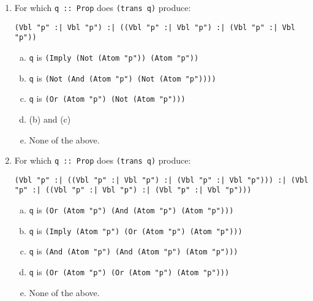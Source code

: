 \documentclass[12pt]{article}
\begin{document}
\begin{enumerate}
\begin{minipage}[t]{2.7in}
{\footnotesize
\begin{verbatim}
data Prop = Atom String
          | Not Prop
          | Imply Prop Prop
          | Or Prop Prop
          | And Prop Prop
          | Iff Prop Prop
          deriving Show

data NAND = Vbl String 
          | NAND :| NAND 
             deriving Show
\end{verbatim}
}
\end{minipage}
\begin{minipage}[t]{2in}
{\footnotesize
\begin{verbatim}
trans :: Prop -> NAND
trans (Atom v)      = Vbl v
trans (Not p)       = trans p :| trans p
trans (Or p1 p2)    = (p1' :| p1') :| (p2' :| p2')
  where p1' = trans p1
        p2' = trans p2
trans (And p1 p2)   = (p1' :| p2') :| (p1' :| p2')
  where p1' = trans p1
        p2' = trans p2
trans (Imply p1 p2) = p1' :| (p2' :| p2')
  where p1' = trans p1
        p2' = trans p2
trans (Iff p1 p2)   = trans (And (Imply p1 p2) (Imply p2 p1))
\end{verbatim}
}
\end{minipage}

\item For which \verb+q :: Prop+ does \verb+(trans q)+ produce:
\begin{verbatim}
(Vbl "p" :| Vbl "p") :| ((Vbl "p" :| Vbl "p") :| (Vbl "p" :| Vbl "p"))
\end{verbatim}

\begin{enumerate}[(a)]
\item \verb+q+ is \verb+(Imply (Not (Atom "p")) (Atom "p"))+
\item \verb+q+ is \verb+(Not (And (Atom "p") (Not (Atom "p"))))+
\item \verb+q+ is \verb+(Or (Atom "p") (Not (Atom "p")))+
\item (b) and (c)
\item None of the above.
\end{enumerate}

\item For which \verb+q :: Prop+ does \verb+(trans q)+ produce:
{\scriptsize\begin{verbatim}
(Vbl "p" :| ((Vbl "p" :| Vbl "p") :| (Vbl "p" :| Vbl "p"))) :| (Vbl "p" :| ((Vbl "p" :| Vbl "p") :| (Vbl "p" :| Vbl "p")))
\end{verbatim}}
\begin{enumerate}[(a)]
\item \verb+q+ is \verb+(Or (Atom "p") (And (Atom "p") (Atom "p")))+
\item \verb+q+ is \verb+(Imply (Atom "p") (Or (Atom "p") (Atom "p")))+
\item \verb+q+ is \verb+(And (Atom "p") (And (Atom "p") (Atom "p")))+
\item \verb+q+ is \verb+(Or (Atom "p") (Or (Atom "p") (Atom "p")))+
\item None of the above.
\end{enumerate}


\end{enumerate}
\end{document}
